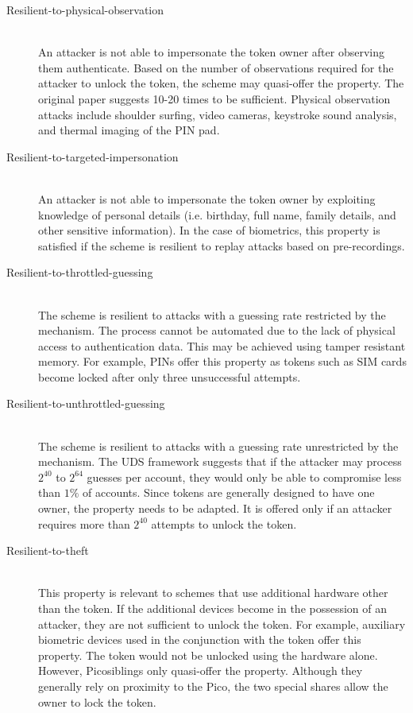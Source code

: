 \begin{description}
  \item[Resilient-to-physical-observation] \hfill \\
  An attacker is not able to impersonate the token owner after observing them authenticate. Based on the number of observations required for the attacker to unlock the token, the scheme may quasi-offer the property. The original paper suggests 10-20 times to be sufficient. Physical observation attacks include shoulder surfing, video cameras, keystroke sound analysis, and thermal imaging of the PIN pad.
  
  \item[Resilient-to-targeted-impersonation] \hfill \\
  An attacker is not able to impersonate the token owner by exploiting knowledge of personal details (i.e. birthday, full name, family details, and other sensitive information). In the case of biometrics, this property is satisfied if the scheme is resilient to replay attacks based on pre-recordings.
  
  \item[Resilient-to-throttled-guessing] \hfill \\
  The scheme is resilient to attacks with a guessing rate restricted by the mechanism. The process cannot be automated due to the lack of physical access to authentication data. This may be achieved using tamper resistant memory. For example, PINs offer this property as tokens such as SIM cards become locked after only three unsuccessful attempts.
  
  \item[Resilient-to-unthrottled-guessing] \hfill \\
  The scheme is resilient to attacks with a guessing rate unrestricted by the mechanism. The UDS framework suggests that if the attacker may process $2^{40}$ to $2^{64}$ guesses per account, they would only be able to compromise less than $1\%$ of accounts. Since tokens are generally designed to have one owner, the property needs to be adapted. It is offered only if an attacker requires more than $2^{40}$ attempts to unlock the token.
  
  \item[Resilient-to-theft] \hfill \\
  This property is relevant to schemes that use additional hardware other than the token. If the additional devices become in the possession of an attacker, they are not sufficient to unlock the token. For example, auxiliary biometric devices used in the conjunction with the token offer this property. The token would not be unlocked using the hardware alone. However, Picosiblings only quasi-offer the property. Although they generally rely on proximity to the Pico, the two special shares allow the owner to lock the token.
  

\end{description}
